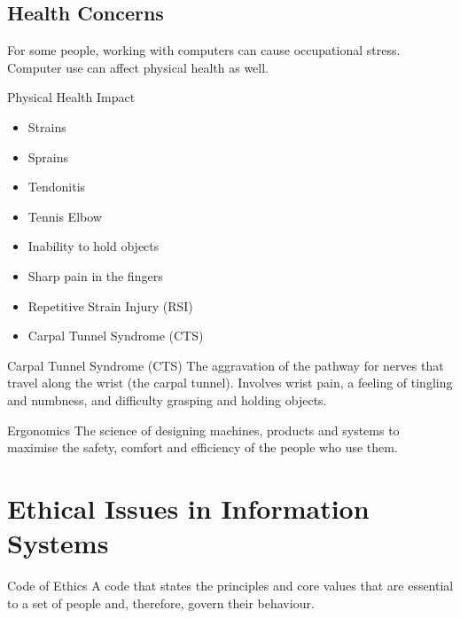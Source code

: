 \documentclass[\main/notes.tex]{subfiles}
\begin{document}
			\subsection{Health Concerns}
				For some people, working with computers can cause occupational stress. Computer use can affect physical health as well.
				\begin{sidenote}{Physical Health Impact}
					\begin{multicols}{2}
						\begin{itemize}[nosep]
							\item Strains
							\item Sprains
							\item Tendonitis
							\item Tennis Elbow
							\item Inability to hold objects
							\item Sharp pain in the fingers
							\item Repetitive Strain Injury (RSI)
							\item Carpal Tunnel Syndrome (CTS)
						\end{itemize}
					\end{multicols}
					\begin{definition}{Carpal Tunnel Syndrome (CTS)}
						The aggravation of the pathway for nerves that travel along the wrist (the carpal tunnel). Involves wrist pain, a feeling of tingling and numbness, and difficulty grasping and holding objects.
					\end{definition}
				\end{sidenote}
			\begin{definition}{Ergonomics}
				The science of designing machines, products and systems to maximise the safety, comfort and efficiency of the people who use them.
			\end{definition}

		\section{Ethical Issues in Information Systems}
			\begin{definition}{Code of Ethics}
				A code that states the principles and core values that are essential to a set of people and, therefore, govern their behaviour.
			\end{definition}

		\pagebreak
\end{document}

